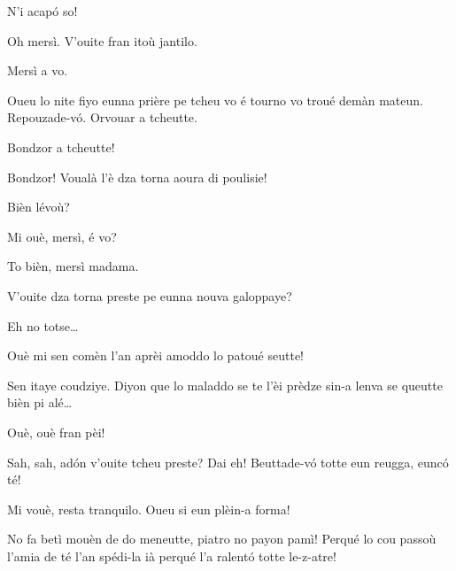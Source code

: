 \begin{drama}
\Eunfeurmispeaks N'i acap\'o so!


\Priespeaks Oh mersì.  V'ouite fran itoù jantilo.

\Eunfeurmispeaks Mersì a vo.

\Priespeaks Oueu lo nite fiyo eunna prière pe tcheu vo é tourno vo troué demàn mateun. Repouzade-v\'o. Orvouar a tcheutte.




\Fennepulisiespeaks Bondzor a tcheutte!

\Casimirspeaks {} Bondzor! Voualà l'è dza torna aoura di poulisie!

\FennepulisieAspeaks Bièn lévoù?

\Gerominespeaks Mi ouè, mersì, é vo?

\FennepulisieBspeaks To bièn, mersì madama.

\Gerominespeaks V'ouite dza torna preste pe eunna nouva galoppaye?

\FennepulisieBspeaks Eh no totse\ldots

\Casimirspeaks Ouè mi sen comèn l’an aprèi amoddo lo patoué seutte!

\FennepulisieCspeaks Sen itaye coudziye. Diyon que lo maladdo se te l’èi prèdze sin-a lenva se queutte bièn pi alé\ldots

\Casimirspeaks Ouè, ouè fran pèi!


\Starterspeaks Sah, sah, ad\'on v'ouite tcheu preste? Dai eh! Beut\-ta\-de-v\'o totte eun reugga, eunc\'o té!

\FennepulisieAspeaks Mi vouè, resta tranquilo. Oueu si eun plèin-a forma!

\Starterspeaks No fa betì mouèn de do meneutte, piatro no payon pamì! Perqué lo cou passoù  l'amia de té l’an spédi-la ià perqué l’a ralent\'o totte le-z-atre!


\end{drama}
